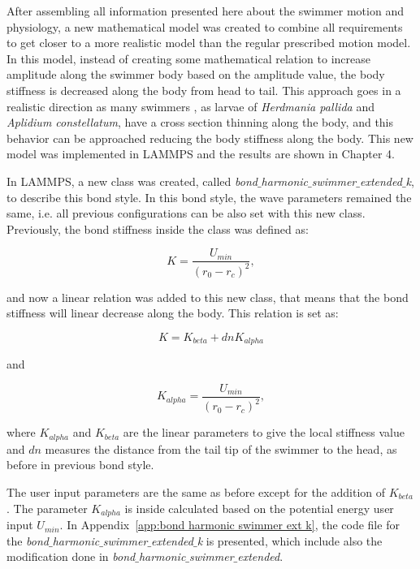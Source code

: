 After assembling all information presented here about the swimmer motion and physiology, a new mathematical model was created to combine all requirements to get closer to a more
realistic model than the regular prescribed motion model. In this model, instead of creating some mathematical relation to increase amplitude along the swimmer body based on the
amplitude value, the body stiffness is decreased along the body from head to tail. This  approach goes in a realistic direction as many swimmers , as larvae of \textit{Herdmania pallida} and
\textit{Aplidium constellatum}, have a cross section thinning along the body, and this behavior can be approached reducing the body stiffness along the body. This new model was
implemented in LAMMPS and the results are shown in Chapter 4. \par

In LAMMPS, a new class was created, called \textit{bond$\_$harmonic$\_$swimmer$\_$extended$\_$k}, to describe this bond style. In this bond style, the wave parameters remained the same, i.e. all previous configurations can be also set with this new class. 
Previously, the bond stiffness inside the class was defined as:

\begin{equation}\label{k}
 K = \frac{U_{min}}{( r_{0} - r_{c})^2} ,
\end{equation}

and now a linear relation was added to this new class, that means that the bond stiffness will linear decrease along the body. This relation is set as:

\begin{equation}
 K = K_{beta} + dn K_{alpha}
\end{equation}

and

\begin{equation}
 K_{alpha} = \frac{U_{min}}{( r_{0} - r_{c})^2} ,
\end{equation}


where $K_{alpha}$ and $K_{beta}$ are the linear parameters to give the local stiffness value and $dn$ measures the distance from the tail tip of the swimmer to the head, as before
in previous bond style.\par

The user input parameters are the same as before except for the addition of $K_{beta}$. The parameter $K_{alpha}$ is inside calculated based on the potential energy user
input $U_{min}$. In Appendix~\ref{app:bond harmonic swimmer ext k}, the code file for the \textit{bond$\_$harmonic$\_$swimmer$\_$extended$\_$k} is presented, which include also
the modification done in \textit{bond$\_$harmonic$\_$swimmer$\_$extended}.








